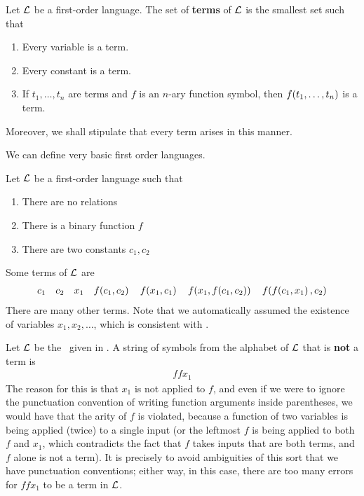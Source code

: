 \begin{boxdefinition}[Terms]
    Let $\mathcal{L}$ be a first-order language. The set of \textbf{terms} of $\mathcal{L}$ is the smallest set such that
    \begin{enumerate}
        \item Every variable is a term.
        \item Every constant is a term.
        \item If $t_1, \ldots, t_n$ are terms and $f$ is an $n$-ary function symbol, then $f\!\left( t_1, \ldots, t_n \right)$ is a term.
    \end{enumerate}
    Moreover, we shall stipulate that every term arises in this manner.
\end{boxdefinition}

We can define very basic first order languages.

\begin{boxexample}\label{Ch2:Eg:Terms_FO_Logic}
    Let $\mathcal{L}$ be a first-order language such that
    \begin{enumerate}
        \item There are no relations
        \item There is a binary function $f$
        \item There are two constants $c_1, c_2$
    \end{enumerate}
    Some terms of $\mathcal{L}$ are
    \begin{align*}
        c_1 \quad c_2 \quad x_1 \quad f\!\left( c_1, c_2 \right) \quad f\!\left( x_1, c_1 \right) \quad f\!\left( x_1, f\!\left( c_1, c_2 \right) \right) \quad f\!\left( f\!\left( c_1, x_1 \right), c_2 \right)
    \end{align*}
    There are many other terms. Note that we automatically assumed the existence of variables $x_1, x_2, \ldots$, which is consistent with . 
\end{boxexample}
\begin{boxnexample}
    Let $\mathcal{L}$ be the \fola\ given in . A string of symbols from the alphabet of $\mathcal{L}$ that is \textbf{not} a term is
    \begin{align*}
        f f x_1
    \end{align*}
    The reason for this is that $x_1$ is not applied to $f$, and even if we were to ignore the punctuation convention of writing function arguments inside parentheses, we would have that the arity of $f$ is violated, because a function of two variables is being applied (twice) to a single input (or the leftmost $f$ is being applied to both $f$ and $x_1$, which contradicts the fact that $f$ takes inputs that are both terms, and $f$ alone is not a term). It is precisely to avoid ambiguities of this sort that we have punctuation conventions; either way, in this case, there are too many errors for $f f x_1$ to be a term in $\mathcal{L}$.
\end{boxnexample}

